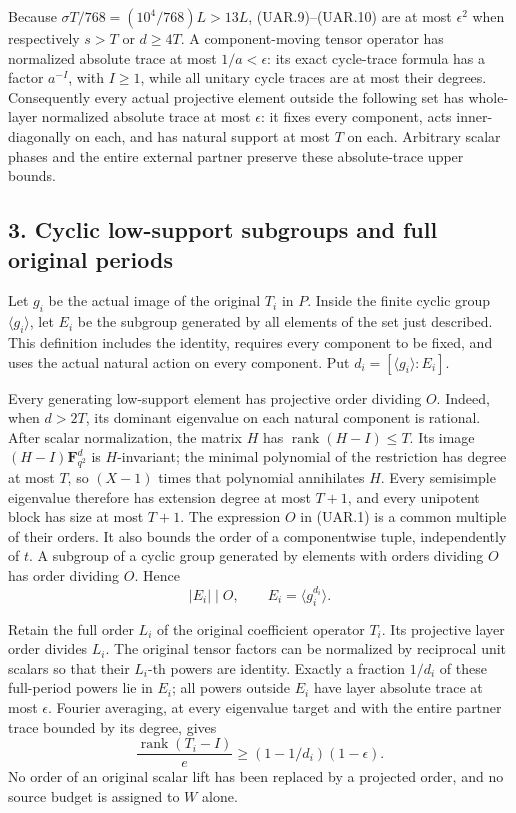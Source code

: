 Because \(\sigma T/768=(10^4/768)L>13L\), (UAR.9)--(UAR.10)
are at most \(\epsilon^2\) when respectively \(s>T\) or
\(d\ge4T\). A component-moving tensor operator has normalized
absolute trace at most \(1/a<\epsilon\): its exact cycle-trace
formula has a factor \(a^{-I}\), with \(I\ge1\), while all unitary
cycle traces are at most their degrees. Consequently every actual
projective element outside the following set has whole-layer
normalized absolute trace at most \(\epsilon\):
it fixes every component, acts inner-diagonally on each, and has
natural support at most \(T\) on each.
Arbitrary scalar phases and the entire external partner preserve
these absolute-trace upper bounds.

\subsection*{3. Cyclic low-support subgroups and full original periods}

Let \(g_i\) be the actual image of the original \(T_i\) in \(P\).
Inside the finite cyclic group \(\langle g_i\rangle\), let \(E_i\)
be the subgroup generated by all elements of the set just described.
This definition includes the identity, requires every component to
be fixed, and uses the actual natural action on every component.
Put \(d_i=[\langle g_i\rangle:E_i]\).

Every generating low-support element has projective order dividing
\(O\). Indeed, when \(d>2T\), its dominant eigenvalue on each
natural component is rational. After scalar normalization, the
matrix \(H\) has \(\operatorname{rank}(H-I)\le T\). Its image
\((H-I)\mathbf F_{q^2}^d\) is \(H\)-invariant; the minimal
polynomial of the restriction has degree at most \(T\), so
\((X-1)\) times that polynomial annihilates \(H\).
Every semisimple eigenvalue therefore has extension degree at most
\(T+1\), and every unipotent block has size at most \(T+1\).
The expression \(O\) in (UAR.1) is a common multiple of their orders.
It also bounds the order of a componentwise tuple, independently
of \(t\). A subgroup of a cyclic group generated by elements with
orders dividing \(O\) has order dividing \(O\). Hence
\[
                 |E_i|\mid O,\qquad E_i=\langle g_i^{d_i}\rangle.
 \tag{UAR.11}
\]

Retain the full order \(L_i\) of the original coefficient operator
\(T_i\). Its projective layer order divides \(L_i\). The original
tensor factors can be normalized by reciprocal unit scalars so
that their \(L_i\)-th powers are identity. Exactly a fraction
\(1/d_i\) of these full-period powers lie in \(E_i\); all powers
outside \(E_i\) have layer absolute trace at most \(\epsilon\).
Fourier averaging, at every eigenvalue target and with the entire
partner trace bounded by its degree, gives
\[
 \frac{\operatorname{rank}(T_i-I)}e
       \ge (1-1/d_i)(1-\epsilon).
 \tag{UAR.12}
\]
No order of an original scalar lift has been replaced by a projected
order, and no source budget is assigned to \(W\) alone.

